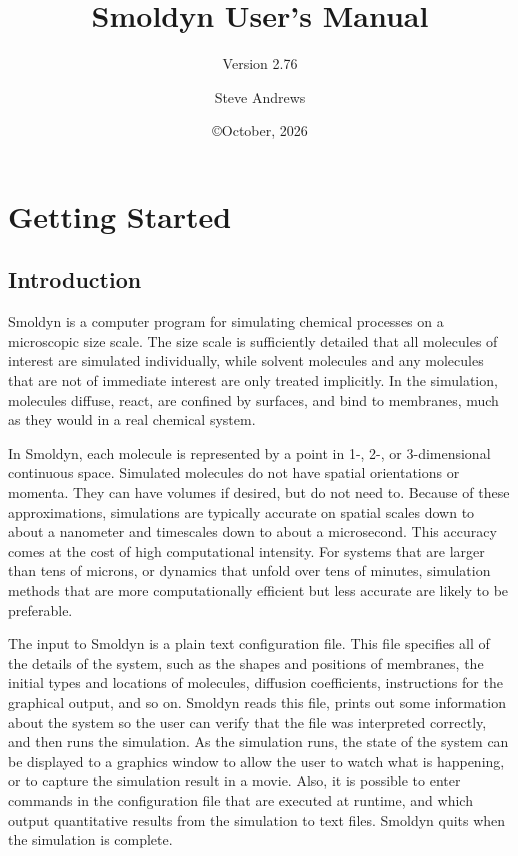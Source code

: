 \documentclass {scrbook}
\begin{document}


\title{Smoldyn User's Manual}
\subtitle{Version 2.76}
\date{\copyright October, 2026}
\author{Steve Andrews}
\maketitle

\tableofcontents


\part{Getting Started}

\chapter{Introduction}

Smoldyn is a computer program for simulating chemical processes on a microscopic size scale. The size scale is sufficiently detailed that all molecules of interest are simulated individually, while solvent molecules and any molecules that are not of immediate interest are only treated implicitly. In the simulation, molecules diffuse, react, are confined by surfaces, and bind to membranes, much as they would in a real chemical system.

In Smoldyn, each molecule is represented by a point in 1-, 2-, or 3-dimensional continuous space. Simulated molecules do not have spatial orientations or momenta. They can have volumes if desired, but do not need to. Because of these approximations, simulations are typically accurate on spatial scales down to about a nanometer and timescales down to about a microsecond. This accuracy comes at the cost of high computational intensity. For systems that are larger than tens of microns, or dynamics that unfold over tens of minutes, simulation methods that are more computationally efficient but less accurate are likely to be preferable.

The input to Smoldyn is a plain text configuration file. This file specifies all of the details of the system, such as the shapes and positions of membranes, the initial types and locations of molecules, diffusion coefficients, instructions for the graphical output, and so on. Smoldyn reads this file, prints out some information about the system so the user can verify that the file was interpreted correctly, and then runs the simulation. As the simulation runs, the state of the system can be displayed to a graphics window to allow the user to watch what is happening, or to capture the simulation result in a movie. Also, it is possible to enter commands in the configuration file that are executed at runtime, and which output quantitative results from the simulation to text files. Smoldyn quits when the simulation is complete.
\end{document}
